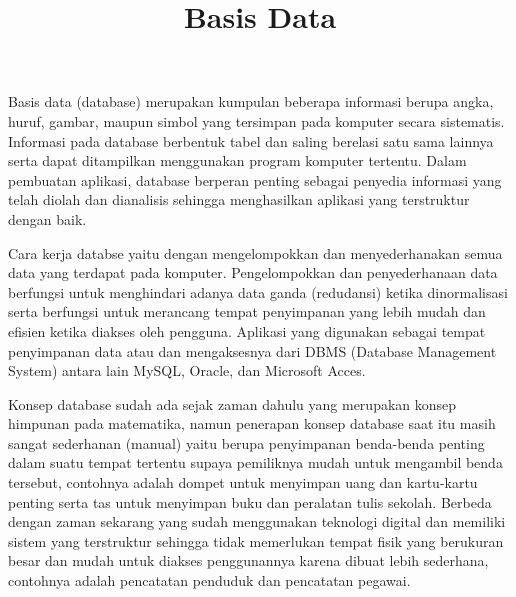 \documentclass[a4paper,12 pt]{article}
\begin{document}
	\begin{flushleft}
		\title{\textbf{Basis Data}\linebreak}

	\par Basis data (database) merupakan kumpulan beberapa informasi 		berupa angka, huruf, gambar, maupun simbol yang tersimpan pada 			komputer secara sistematis. Informasi pada database berbentuk 			tabel dan saling berelasi satu sama lainnya serta dapat 				ditampilkan menggunakan program komputer tertentu. Dalam 				pembuatan aplikasi, database berperan penting sebagai penyedia 			informasi yang telah diolah dan dianalisis sehingga menghasilkan 		aplikasi yang terstruktur dengan baik.\\
	\par Cara kerja databse yaitu dengan mengelompokkan dan 				menyederhanakan semua data yang terdapat pada komputer. 				Pengelompokkan dan penyederhanaan data berfungsi untuk 					menghindari adanya data ganda (redudansi) ketika dinormalisasi 			serta berfungsi untuk merancang tempat penyimpanan yang lebih 			mudah dan efisien ketika diakses oleh pengguna. Aplikasi yang 			digunakan sebagai tempat penyimpanan data atau dan mengaksesnya 		dari DBMS (Database Management System) antara lain MySQL, Oracle, 	dan Microsoft Acces.\\
	\par Konsep database sudah ada sejak zaman dahulu yang merupakan 		konsep himpunan pada matematika, namun penerapan konsep database 		saat itu masih sangat sederhanan (manual) yaitu berupa 					penyimpanan benda-benda penting dalam suatu tempat tertentu 			supaya pemiliknya mudah untuk mengambil benda tersebut, contohnya 	adalah dompet untuk menyimpan uang dan kartu-kartu penting serta 		tas untuk menyimpan buku dan peralatan tulis sekolah. Berbeda 			dengan zaman sekarang yang sudah menggunakan teknologi digital 			dan memiliki sistem yang terstruktur sehingga tidak memerlukan 			tempat fisik yang berukuran besar dan mudah untuk diakses 				penggunannya karena dibuat lebih sederhana, contohnya adalah 			pencatatan penduduk dan pencatatan pegawai.\\

\end{flushleft}
\end{document}

